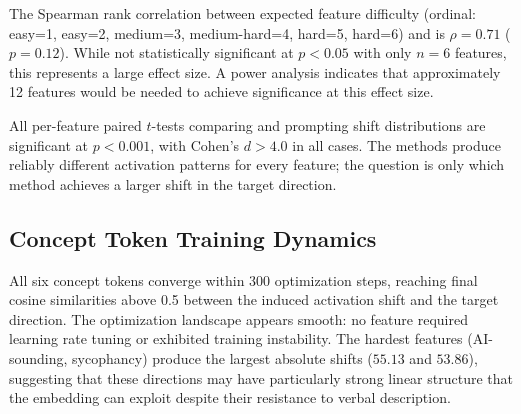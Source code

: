 The Spearman rank correlation between expected feature difficulty (ordinal: easy=1, easy=2, medium=3, medium-hard=4, hard=5, hard=6) and \ctadvantage is $\rho = 0.71$ ($p = 0.12$). While not statistically significant at $p < 0.05$ with only $n = 6$ features, this represents a large effect size. A power analysis indicates that approximately 12 features would be needed to achieve significance at this effect size.

All per-feature paired $t$-tests comparing \ct and prompting shift distributions are significant at $p < 0.001$, with Cohen's $d > 4.0$ in all cases. The methods produce reliably different activation patterns for every feature; the question is only which method achieves a larger shift in the target direction.

\subsection{Concept Token Training Dynamics}
\label{sec:training}

All six concept tokens converge within 300 optimization steps, reaching final cosine similarities above 0.5 between the induced activation shift and the target direction. The optimization landscape appears smooth: no feature required learning rate tuning or exhibited training instability. The hardest features (AI-sounding, sycophancy) produce the largest absolute \ct shifts ($55.13$ and $53.86$), suggesting that these directions may have particularly strong linear structure that the embedding can exploit despite their resistance to verbal description.
